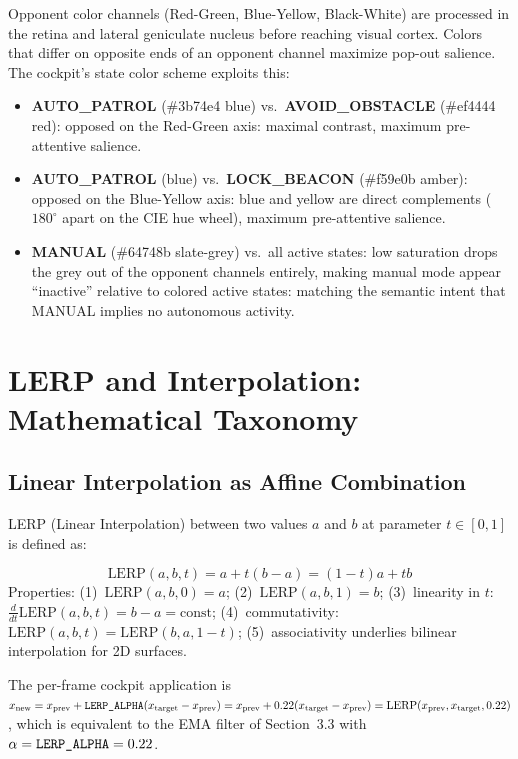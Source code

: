 Opponent color channels (Red-Green, Blue-Yellow, Black-White) are processed in the retina and lateral geniculate nucleus before reaching visual cortex. Colors that differ on opposite ends of an opponent channel maximize pop-out salience. The cockpit's state color scheme exploits this:

\begin{itemize}[leftmargin=1.4em]
  \item \textbf{AUTO\_PATROL} (\#3b74e4 blue) vs.\ \textbf{AVOID\_OBSTACLE} (\#ef4444 red): opposed on the Red-Green axis: maximal contrast, maximum pre-attentive salience.
  \item \textbf{AUTO\_PATROL} (blue) vs.\ \textbf{LOCK\_BEACON} (\#f59e0b amber): opposed on the Blue-Yellow axis: blue and yellow are direct complements ($180^\circ$ apart on the CIE hue wheel), maximum pre-attentive salience.
  \item \textbf{MANUAL} (\#64748b slate-grey) vs.\ all active states: low saturation drops the grey out of the opponent channels entirely, making manual mode appear ``inactive'' relative to colored active states: matching the semantic intent that MANUAL implies no autonomous activity.
\end{itemize}

\section{LERP and Interpolation: Mathematical Taxonomy}

\subsection{Linear Interpolation as Affine Combination}

LERP (Linear Interpolation) between two values $a$ and $b$ at parameter $t\in[0,1]$ is defined as:

\begin{eqblock}
\begin{equation}
\text{LERP}(a,b,t) = a + t(b-a) = (1-t)a + tb
\end{equation}
Properties: (1)~$\text{LERP}(a,b,0)=a$; (2)~$\text{LERP}(a,b,1)=b$; (3)~linearity in $t$: $\frac{d}{dt}\text{LERP}(a,b,t) = b-a = \text{const}$; (4)~commutativity: $\text{LERP}(a,b,t)=\text{LERP}(b,a,1-t)$; (5)~associativity underlies bilinear interpolation for 2D surfaces.
\end{eqblock}

The per-frame cockpit application is $x_{\text{new}} = x_{\text{prev}} + \code{LERP\_ALPHA}(x_{\text{target}}-x_{\text{prev}}) = x_{\text{prev}} + 0.22(x_{\text{target}}-x_{\text{prev}}) = \text{LERP}(x_{\text{prev}}, x_{\text{target}}, 0.22)$, which is equivalent to the EMA filter of Section~3.3 with $\alpha = \code{LERP\_ALPHA} = 0.22$.

